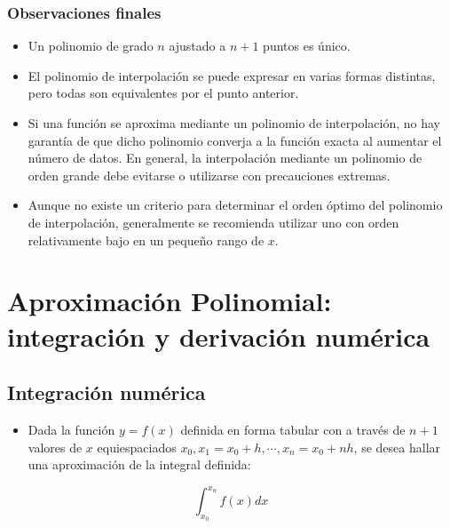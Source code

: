 \documentclass[openany]{book}
\providecommand{\tightlist}{%
  \setlength{\itemsep}{0pt}\setlength{\parskip}{0pt}}
\begin{document}
\hypertarget{observaciones-finales}{%
\subsection{Observaciones finales}\label{observaciones-finales}}

\begin{itemize}
\tightlist
\item
  Un polinomio de grado \(n\) ajustado a \(n+1\) puntos es único.
\item
  El polinomio de interpolación se puede expresar en varias formas distintas, pero todas son equivalentes por el punto anterior.
\item
  Si una función se aproxima mediante un polinomio de interpolación, no hay garantía de que dicho polinomio converja a la función exacta al aumentar el número de datos. En general, la interpolación mediante un polinomio de orden grande debe evitarse o utilizarse con precauciones extremas.
\item
  Aunque no existe un criterio para determinar el orden óptimo del polinomio de interpolación, generalmente se recomienda utilizar uno con orden relativamente bajo en un pequeño rango de \(x\).
\end{itemize}

\hypertarget{aproximaciuxf3n-polinomial-integraciuxf3n-y-derivaciuxf3n-numuxe9rica}{%
\chapter{Aproximación Polinomial: integración y derivación numérica}\label{aproximaciuxf3n-polinomial-integraciuxf3n-y-derivaciuxf3n-numuxe9rica}}

\hypertarget{integraciuxf3n-numuxe9rica}{%
\section{Integración numérica}\label{integraciuxf3n-numuxe9rica}}

\begin{itemize}
\tightlist
\item
  Dada la función \(y = f(x)\) definida en forma tabular con a través de \(n+1\) valores de \(x\) equiespaciados \(x_0, x_1 = x_0 + h, \cdots, x_n = x_0 + nh\), se desea hallar una aproximación de la integral definida:
\end{itemize}

\begin{equation}
\label{eq:ec1}
\int_{x_0}^{x_n} f(x)dx
\end{equation}
\end{document}
